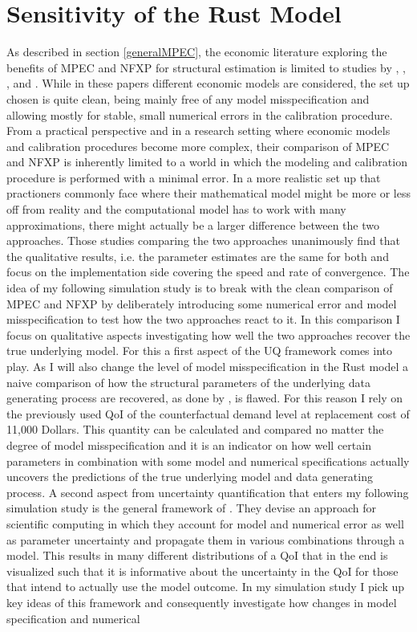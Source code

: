 \section{Sensitivity of the Rust Model}
\thispagestyle{plain} %

As described in section \ref{generalMPEC}, the economic literature exploring the benefits of MPEC and NFXP for structural estimation is limited to studies by \cite{Su.Judd.2012}, \cite{Dube.Fox.Su.2012}, \cite{Jorgensen.2013}, \cite{Iskhakov.2016} and \cite{Dong.Hsieh.Zhang.2017}. While in these papers different economic models are considered, the set up chosen is quite clean, being mainly free of any model misspecification and allowing mostly for stable, small numerical errors in the calibration procedure. From a practical perspective and in a research setting where economic models and calibration procedures become more complex, their comparison of MPEC and NFXP is inherently limited to a world in which the modeling and calibration procedure is performed with a minimal error. In a more realistic set up that practioners commonly face where their mathematical model might be more or less off from reality and the computational model has to work with many approximations, there might actually be a larger difference between the two approaches. Those studies comparing the two approaches unanimously find that the qualitative results, i.e. the parameter estimates are the same for both and focus on the implementation side covering the speed and rate of convergence. The idea of my following simulation study is to break with the clean comparison of MPEC and NFXP by deliberately introducing some numerical error and model misspecification to test how the two approaches react to it. In this comparison I focus on qualitative aspects investigating how well the two approaches recover the true underlying model. For this a first aspect of the UQ framework comes into play. As I will also change the level of model misspecification in the Rust model a naive comparison of how the structural parameters of the underlying data generating process are recovered, as done by \cite{Su.Judd.2012}, is flawed. For this reason I rely on the previously used QoI of the counterfactual demand level at replacement cost of 11,000 Dollars. This quantity can be calculated and compared no matter the degree of model misspecification and it is an indicator on how well certain parameters in combination with some model and numerical specifications actually uncovers the predictions of the true underlying model and data generating process. A second aspect from uncertainty quantification that enters my following simulation study is the general framework of \cite{Oberkampf.2010}. They devise an approach for scientific computing in which they account for model and numerical error as well as parameter uncertainty and propagate them in various combinations through a model. This results in many different distributions of a QoI that in the end is visualized such that it is informative about the uncertainty in the QoI for those that intend to actually use the model outcome. In my simulation study I pick up key ideas of this framework and consequently investigate how changes in model specification and numerical 